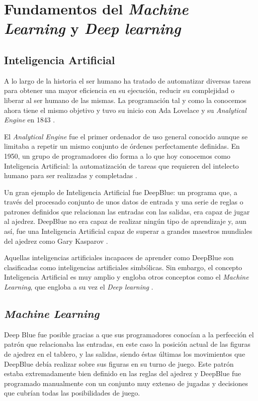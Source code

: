 \chapter{Fundamentos del \textit{Machine Learning} y \textit{Deep learning}}
\label{cap3:ia}



\section{Inteligencia Artificial}
A lo largo de la historia el ser humano ha tratado de automatizar diversas tareas para obtener una mayor eficiencia en su ejecución, reducir su complejidad o liberar al ser humano de las mismas. La programación tal y como la conocemos ahora tiene el mismo objetivo y tuvo su inicio con Ada Lovelace y su \textit{Analytical Engine} en 1843 \cite{lovelace1843}.

El \textit{Analytical Engine} fue el primer ordenador de uso general conocido aunque se limitaba a repetir un mismo conjunto de órdenes perfectamente definidas. En 1950, un grupo de programadores dio forma a lo que hoy conocemos como Inteligencia Artificial: la automatización de tareas que requieren del intelecto humano para ser realizadas y completadas \cite{mccarthy1955}.

Un gran ejemplo de Inteligencia Artificial fue DeepBlue: un programa que, a través del procesado conjunto de unos datos de entrada y una serie de reglas o patrones definidos que relacionan las entradas con las salidas, era capaz de jugar al ajedrez. DeepBlue no era capaz de realizar ningún tipo de aprendizaje y, aun así, fue una Inteligencia Artificial capaz de superar a grandes maestros mundiales del ajedrez como Gary Kasparov \cite{deepblue}.

Aquellas inteligencias artificiales incapaces de aprender como DeepBlue son clasificadas como inteligencias artificiales simbólicas. Sin embargo, el concepto Inteligencia Artificial es muy amplio y engloba otros conceptos como el \textit{Machine Learning}, que engloba a su vez el \textit{Deep learning} \cite{machinelearningbook, machinelearningbook1}.




\section{\textit{Machine Learning}}
Deep Blue fue posible gracias a que sus programadores conocían a la perfección el patrón que relacionaba las entradas, en este caso la posición actual de las figuras de ajedrez en el tablero, y las salidas, siendo éstas últimas los movimientos que DeepBlue debía realizar sobre sus figuras en su turno de juego. Este patrón estaba extremadamente bien definido en las reglas del ajedrez y DeepBlue fue programado manualmente con un conjunto muy extenso de jugadas y decisiones que cubrían todas las posibilidades de juego.

